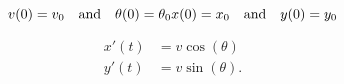 $$
v(0) = v_0 \quad \text{and} \quad \theta(0) = \theta_0\\
x(0) = x_0 \quad \text{and} \quad y(0) = y_0
$$

\begin{align}
x'(t) & = v \cos(\theta) \\
y'(t) & = v \sin(\theta).
\end{align}
